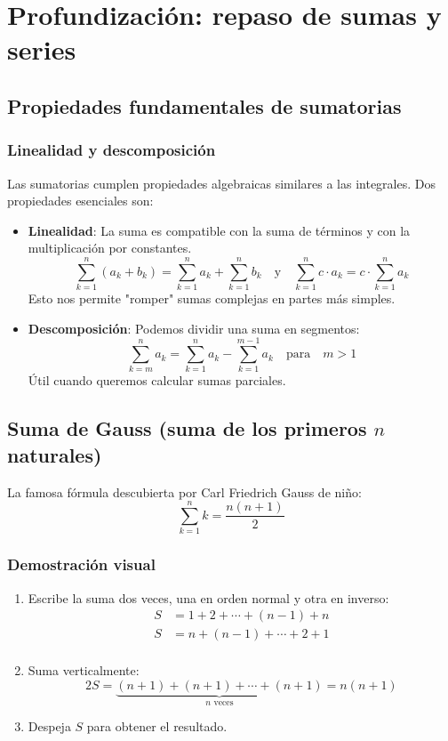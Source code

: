 \documentclass[letterpaper, 12pt]{article}
\begin{document}
	\section{Profundización: repaso de sumas y series}
	
	\subsection{Propiedades fundamentales de sumatorias}
	
	\subsubsection{Linealidad y descomposición}
	
	Las sumatorias cumplen propiedades algebraicas similares a las integrales. Dos propiedades esenciales son:
	
	\begin{itemize}
		\item \textbf{Linealidad}: La suma es compatible con la suma de términos y con la multiplicación por constantes.
		\[
		\sum_{k=1}^n (a_k + b_k) = \sum_{k=1}^n a_k + \sum_{k=1}^n b_k \quad \text{y} \quad \sum_{k=1}^n c \cdot a_k = c \cdot \sum_{k=1}^n a_k
		\]
		Esto nos permite "romper" sumas complejas en partes más simples.
		
		\item \textbf{Descomposición}: Podemos dividir una suma en segmentos:
		\[
		\sum_{k=m}^n a_k = \sum_{k=1}^n a_k - \sum_{k=1}^{m-1} a_k \quad \text{para} \quad m > 1
		\]
		Útil cuando queremos calcular sumas parciales.
	\end{itemize}
	
	\subsection{Suma de Gauss (suma de los primeros $n$ naturales)}
	
	La famosa fórmula descubierta por Carl Friedrich Gauss de niño:
	\[
	\sum_{k=1}^n k = \frac{n(n+1)}{2}
	\]
	
	\subsubsection{Demostración visual}
	
	\begin{enumerate}
		\item Escribe la suma dos veces, una en orden normal y otra en inverso:
		\[
		\begin{aligned}
			S &= 1 + 2 + \cdots + (n-1) + n \\
			S &= n + (n-1) + \cdots + 2 + 1 \\
		\end{aligned}
		\]
		
		\item Suma verticalmente:
		\[
		2S = \underbrace{(n+1) + (n+1) + \cdots + (n+1)}_{n \text{ veces}} = n(n+1)
		\]
		
		\item Despeja $S$ para obtener el resultado.
	\end{enumerate}
	
\end{document}
